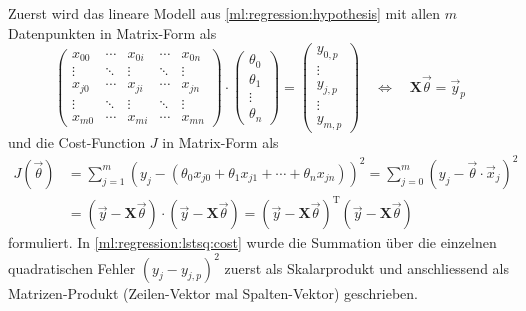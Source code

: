Zuerst wird das lineare Modell aus \eqref{ml:regression:hypothesis} mit allen
$m$ Datenpunkten in Matrix-Form als
\begin{equation}
    \begin{pmatrix}
        x_{00}& \cdots& x_{0i}& \cdots& x_{0n}\\
        \vdots& \ddots& \vdots& \ddots& \vdots\\
        x_{j0}& \cdots& x_{ji}& \cdots& x_{jn}\\
        \vdots& \ddots& \vdots& \ddots& \vdots\\
        x_{m0}& \cdots& x_{mi}& \cdots& x_{mn}
    \end{pmatrix}
    \cdot
    \begin{pmatrix}
        \theta_0\\ \theta_1 \\ \vdots\\ \theta_n
    \end{pmatrix}
    = \begin{pmatrix}
        y_{0,p}\\ \vdots \\ y_{j,p} \\ \vdots \\ y_{m,p}
    \end{pmatrix}
    \quad \iff \quad
    \mathbf{X} \vec \theta = \vec y_p
    \label{ml:regression:lstsq:modell}
\end{equation}
und die Cost-Function $J$ in Matrix-Form als
\begin{align}
    J(\vec \theta) &= \sum_{j=1}^m \left(y_j - (\theta_0 x_{j0} + \theta_1 x_{j1} + \cdots + \theta_n x_{jn}) \right)^2
    = \sum_{j=0}^{m} \left( y_j - \vec \theta \cdot \vec x_j \right)^2 \nonumber\\
    &= \left(\vec y - \mathbf{X} \vec \theta\right) \cdot \left(\vec y - \mathbf{X} \vec \theta\right)
    = \left(\vec y - \mathbf{X} \vec \theta\right)^\mathrm{T} \left(\vec y - \mathbf{X} \vec \theta\right)
    \label{ml:regression:lstsq:cost}
\end{align}
formuliert. In \eqref{ml:regression:lstsq:cost} wurde die Summation über die
einzelnen quadratischen Fehler $(y_j - y_{j,p})^2$ zuerst als Skalarprodukt und
anschliessend als Matrizen-Produkt (Zeilen-Vektor mal Spalten-Vektor) geschrieben.

